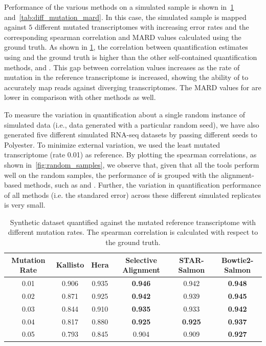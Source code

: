 Performance of the various methods on a simulated sample is shown in~\cref{tab:diff_mutation_sp}
and~\cref{tab:diff_mutation_mard}. In this case, 
the simulated sample is mapped against $5$ different mutated transcriptomes with increasing error rates and the 
corresponding spearman correlation and MARD values calculated using the ground truth. As shown in 
\cref{tab:diff_mutation_sp}, the correlation between quantification estimates using \sla and the ground truth is 
higher than the other self-contained quantification methods, \kallisto and \hera. This gap between correlation 
values increases as the rate of mutation in the reference transcriptome is increased, showing the ability of 
\sla to accurately map reads against diverging transcriptomes. The MARD values for \sla are lower in comparison 
with other \nab methods as well.

To measure the variation in quantification about a single random instance of simulated data (i.e., data generated 
with a particular random seed), we have also generated five different simulated RNA-seq datasets by passing 
different seeds to Polyester. To minimize external variation, we used the least mutated transcriptome 
(rate 0.01) as reference. By plotting the spearman correlations, as shown in~\cref{fig:random_samples}, 
we observe that, given that all the tools perform well on the random samples, the performance of \sla is grouped 
with the alignment-based methods, such as \bt and \STAR.  Further, the variation in quantification performance of 
all methods (i.e. the standared error) across these different simulated replicates is very small.

\begin{table}
\begin{center}
\begin{tabular} {c|c c c c c}
\toprule
  Mutation Rate & Kallisto & Hera & Selective Alignment & STAR-Salmon &Bowtie2-Salmon \\
\midrule
  0.01 & 0.906 & 0.935 & \textbf{0.946} & 0.942 & \textbf{0.948} \\
  0.02 & 0.871 & 0.925 & \textbf{0.942} & 0.939 & \textbf{0.945} \\
  0.03 & 0.844 & 0.910 & \textbf{0.935} & 0.933 & \textbf{0.942} \\
  0.04 & 0.817 & 0.880 & \textbf{0.925} & \textbf{0.925} & \textbf{0.937} \\
  0.05 & 0.793 & 0.845 & 0.904 & 0.909 & \textbf{0.927} \\
\bottomrule
\end{tabular}
\caption[Acuracy of qunatification of synthetic dataset against the mutated reference transcriptome]{
  {Synthetic dataset quantified against the mutated reference transcriptome with different mutation rates. 
  The spearman correlation is calculated with respect to the ground truth.}
}
\vspace{-0.3in}
\label{tab:diff_mutation_sp}
\end{center}
\end{table}

